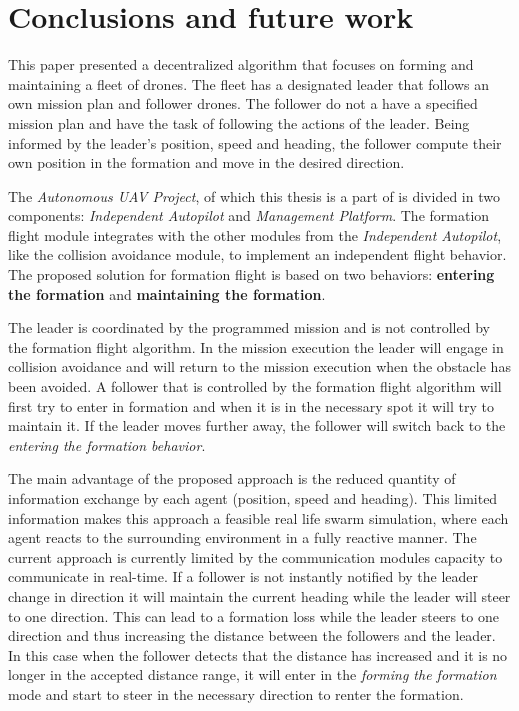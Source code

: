 \chapter{Conclusions and future work}
\label{chapter:conclusionfw}
This paper presented a decentralized algorithm that focuses on forming and maintaining
a fleet of drones. The fleet has a designated leader that follows an own mission
plan and follower drones. The follower do not a have a specified mission plan 
and have the task of following the actions of the leader. Being informed
by the leader's position, speed and heading,  the follower compute their own
position in the formation and move in the desired direction. 

The \textit{Autonomous UAV Project}, of which this thesis is a part of is divided
in two components: \textit{Independent Autopilot} and \textit{Management Platform}.
The formation flight module integrates with the other modules from the \textit{
Independent Autopilot}, like the collision avoidance module, to implement an 
independent flight behavior. The proposed solution for formation flight is
based on two behaviors: \textbf{entering the formation} and \textbf{maintaining
the formation}.

The leader is coordinated by the programmed mission and is not controlled
by the formation flight algorithm. In the mission execution the leader will
engage in collision avoidance and will return to the mission execution when
the obstacle has been avoided. A follower that is controlled by the formation
flight algorithm will first try to enter in formation and when it is in the
necessary spot it will try to maintain it. If the leader moves further away, 
the follower will switch back to the \textit{entering the formation behavior}.

The main advantage of the proposed approach is the reduced quantity of information
exchange by each agent (position, speed and heading). This limited information
makes this approach a feasible real life swarm simulation, where each agent
reacts to the surrounding environment in a fully reactive manner. The current
approach is currently limited by the communication modules capacity to communicate
in real-time. If a follower is not instantly notified by the leader change in 
direction it will maintain the current heading while the leader will steer to one
direction. This can lead to a formation loss while the leader steers to one direction
and thus increasing the distance between the followers and the leader. In this
case when the follower detects that the distance has increased and it is no longer
in the accepted distance range, it will enter in the \textit{forming the formation}
mode and start to steer in the necessary direction to renter the formation.

